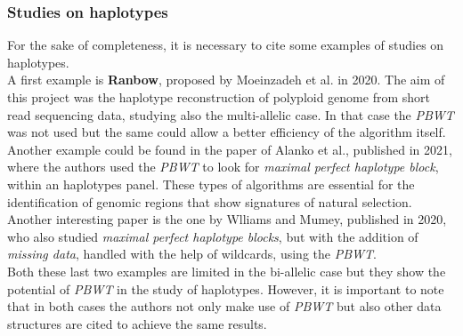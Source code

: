 \documentclass[a4paper,11pt, oneside]{article}
\begin{document}
\subsubsection*{Studies on haplotypes}
For the sake of completeness, it is necessary to cite some examples of studies
on haplotypes. \\
A first example is \textbf{Ranbow}, proposed by Moeinzadeh et al. in 2020. The
aim of this project was the haplotype reconstruction of polyploid genome from
short read sequencing data, studying also the multi-allelic case. In that case
the \textit{PBWT} was not used but the same could allow a better efficiency of
the algorithm itself.\\
Another example could be found in the paper of Alanko et al., published in
2021, where the authors used the \textit{PBWT} to look for \textit{maximal
  perfect haplotype block}, within an haplotypes panel. These types of
algorithms are essential for the identification of genomic regions that show
signatures of natural selection.\\
Another interesting paper is the one by Wlliams and Mumey, published in 2020,
who also studied \textit{maximal perfect haplotype blocks}, but with the
addition of \textit{missing data}, handled with the help of wildcards, using the
\textit{PBWT}. \\ 
Both these last
two examples are limited in the bi-allelic case but they show the potential of
\textit{PBWT} in the study of haplotypes. However, it is important to note that
in both cases the authors not only make use of \textit{PBWT} but also other data
structures are cited to achieve the same results. 
\end{document}
